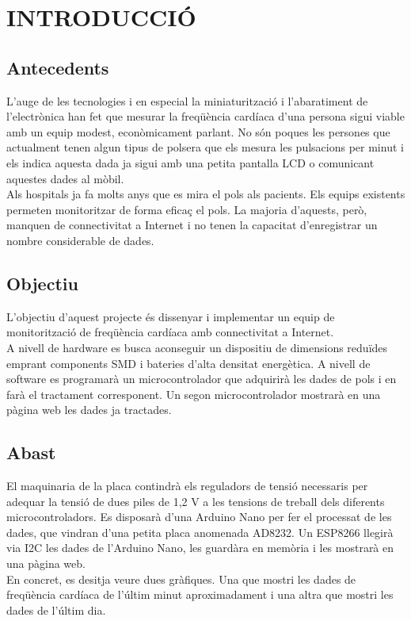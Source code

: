 \chapter{\uppercase{Introducció}}

\section{Antecedents}
L'auge de les tecnologies i en especial la miniaturització i l'abaratiment de l'electrònica han fet que mesurar la freqüència cardíaca d'una persona sigui viable amb un equip modest, econòmicament parlant. No són poques les persones que actualment tenen algun tipus de polsera que els mesura les pulsacions per minut i els indica aquesta dada ja sigui amb una petita pantalla LCD o comunicant aquestes dades al mòbil.\\
\newline Als hospitals ja fa molts anys que es mira el pols als pacients. Els equips existents permeten monitoritzar de forma eficaç el pols. La majoria d'aquests, però, manquen de connectivitat a Internet i no tenen la capacitat d'enregistrar un nombre considerable de dades.

\section{Objectiu}
L'objectiu d'aquest projecte és dissenyar i implementar un equip de monitorització de freqüència cardíaca amb connectivitat a Internet.\\
\newline A nivell de hardware es busca aconseguir un dispositiu de dimensions reduïdes emprant components SMD i bateries d'alta densitat energètica.  A nivell de software es programarà un microcontrolador que adquirirà les dades de pols i en farà el tractament corresponent. Un segon microcontrolador mostrarà en una pàgina web les dades ja tractades.

\section{Abast}
El maquinaria de la placa contindrà els reguladors de tensió necessaris per adequar la tensió de dues piles de 1,2 V a les tensions de treball dels diferents microcontroladors. Es disposarà d'una Arduino Nano per fer el processat de les dades, que vindran d'una petita placa anomenada AD8232. Un ESP8266 llegirà via I2C les dades de l'Arduino Nano, les guardàra en memòria i les mostrarà en una pàgina web.\\
\newline En concret, es desitja veure dues gràfiques. Una que mostri les dades de freqüència cardíaca de l'últim minut aproximadament i una altra que mostri les dades de l'últim dia.\\
\newline 



